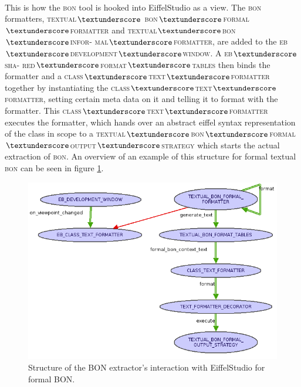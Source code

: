 \paragraph{}
This is how the \textsc{bon} tool is hooked into EiffelStudio as a view. The \textsc{bon} formatters, \textsc{textual$\textunderscore$ bon$\textunderscore$formal$\textunderscore$formatter} and \textsc{textual$\textunderscore$bon$\textunderscore$infor- mal$\textunderscore$formatter}, are added to the \textsc{eb$\textunderscore$development$\textunderscore$window}. A \textsc{eb$\textunderscore$sha- red$\textunderscore$format$\textunderscore$tables} then binds the formatter and a \textsc{class$\textunderscore$text$\textunderscore$formatter} together by instantiating the \textsc{class$\textunderscore$text$\textunderscore$formatter}, setting certain meta data on it and telling it to format with the formatter. This \textsc{class$\textunderscore$text$\textunderscore$formatter} executes the formatter, which hands over an abstract eiffel syntax representation of the class in scope to a \textsc{textual$\textunderscore$bon$\textunderscore$formal$\textunderscore$output$\textunderscore$strategy} which starts the actual extraction of \textsc{bon}. An overview of  an example of this structure for formal textual \textsc{bon} can be seen in figure \ref{fig:extractor_structure}.
\begin{figure}[h]
\centerline{
\includegraphics[scale=0.7]{images/BON-extractor-structure-large.png}
}
\caption{Structure of the BON extractor's interaction with EiffelStudio for formal BON.}
\label{fig:extractor_structure}
\end{figure}

